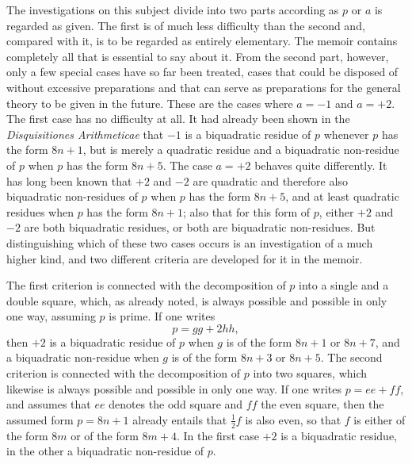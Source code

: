 \documentclass[12pt]{article}
\begin{document}
The investigations on this subject divide into two parts according as $p$ or $a$ is regarded as given. The first is of much less difficulty than the second and, compared with it, is to be regarded as entirely elementary. The memoir contains completely all that is essential to say about it. From the second part, however, only a few special cases have so far been treated, cases that could be disposed of without excessive preparations and that can serve as preparations for the general theory to be given in the future. These are the cases where $a=-1$ and $a=+2$. The first case has no difficulty at all. It had already been shown in the \textit{Disquisitiones Arithmeticae} that $-1$ is a biquadratic residue of $p$ whenever $p$ has the form $8n+1$, but is merely a quadratic residue and a biquadratic non-residue of $p$ when $p$ has the form $8n+5$. The case $a=+2$ behaves quite differently. It has long been known that $+2$ and $-2$ are quadratic and therefore also biquadratic non-residues of $p$ when $p$ has the form $8n+5$, and at least quadratic residues when $p$ has the form $8n+1$; also that for this form of $p$, either $+2$ and $-2$ are both biquadratic residues, or both are biquadratic non-residues. But distinguishing which of these two cases occurs is an investigation of a much higher kind, and two different criteria are developed for it in the memoir.

The first criterion is connected with the decomposition of $p$ into a single and a double square, which, as already noted, is always possible and possible in only one way, assuming $p$ is prime. If one writes
\[
p=gg+2hh,
\]
then $+2$ is a biquadratic residue of $p$ when $g$ is of the form $8n+1$ or $8n+7$, and a biquadratic non-residue when $g$ is of the form $8n+3$ or $8n+5$. The second criterion is connected with the decomposition of $p$ into two squares, which likewise is always possible and possible in only one way. If one writes $p=ee+ff$, and assumes that $ee$ denotes the odd square and $ff$ the even square, then the assumed form $p=8n+1$ already entails that $\frac12f$ is also even, so that $f$ is either of the form $8m$ or of the form $8m+4$. In the first case $+2$ is a biquadratic residue, in the other a biquadratic non-residue of $p$.
\end{document}
